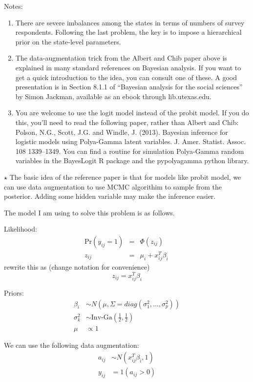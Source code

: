 \documentclass[11pt]{article}
\newcommand{\jie}{$\star$ }
\begin{document}
Notes:
\begin{enumerate}
\item There are severe imbalances among the states in terms of numbers of survey respondents. Following the last problem, the key is to impose a hierarchical prior on the state-level parameters.
\item The data-augmentation trick from the Albert and Chib paper above is explained in many standard references on Bayesian analysis.  If you want to get a quick introduction to the idea, you can consult one of these.  A good presentation is in Section 8.1.1 of ``Bayesian analysis for the social sciences'' by Simon Jackman, available as an ebook through lib.utexas.edu.
\item You are welcome to use the logit model instead of the probit model.  If you do this, you'll need to read the following paper, rather than Albert and Chib: Polson, N.G., Scott, J.G. and Windle, J. (2013). Bayesian inference for logistic models using Polya-Gamma latent variables. J. Amer. Statist. Assoc. 108 1339--1349.    You can find a routine for simulation Polya-Gamma random variables in the BayesLogit R package and the pypolyagamma python library.  
\end{enumerate}

\bigskip \jie
The basic idea of the reference paper is that for models like probit model, we can use data augmentation to use MCMC algorithim to sample from the posterior. Adding some hidden variable may make the inference easier.

The model I am using to solve this problem is as follows.

Likelihood:
\begin{eqnarray*}
\mbox{Pr}(y_{ij} = 1) &=& \Phi(z_{ij})  \\
z_{ij} &=& \mu_i + x_{ij}^T \beta_i \, 
\end{eqnarray*}
rewrite this as (change notation for convenience)
$$z_{ij} = x_{ij}^T \beta_i$$

Priors:
\begin{align*}
    \beta_i &\sim N(\mu, \Sigma = diag(\sigma_1^2, \dots, \sigma_p^2)) \\
    \sigma_k^2 &\sim \text{Inv-Ga}(\frac{1}2, \frac{1}2) \\
    \mu &\propto 1
\end{align*}

We can use the following data augmentation:
\begin{align*}
    a_{ij} &\sim N(x_{ij}^T \beta_i, 1) \\
    y_{ij} &= 1(a_{ij} >0)
\end{align*}
\end{document}
